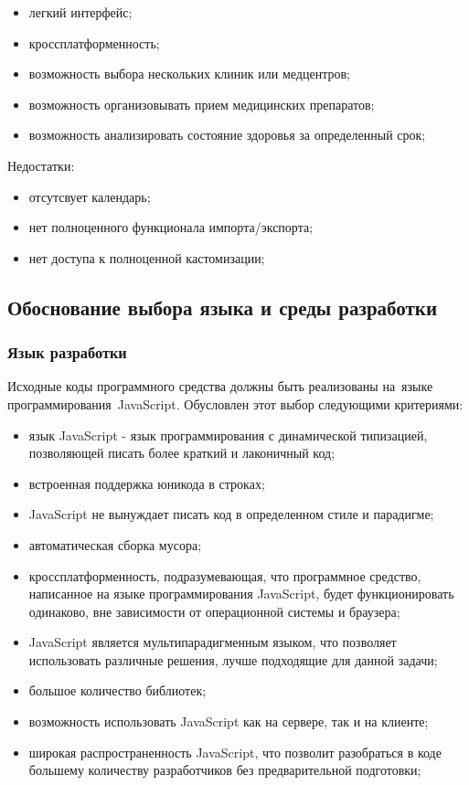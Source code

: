 \begin{itemize}
  \item легкий интерфейс;
  \item кроссплатформенность;
  \item возможность выбора нескольких клиник или медцентров;
  \item возможность организовывать прием медицинских препаратов;
  \item возможность анализировать состояние здоровья за определенный срок;
\end{itemize}
Недостатки:
\begin{itemize}
  \item отсутсвует календарь;
  \item нет полноценного функционала импорта/экспорта;
  \item нет доступа к полноценной кастомизации;
\end{itemize}


\subsection{Обоснование выбора языка и среды разработки} %
\label{sub:domain:existing_language}
\subsubsection{Язык разработки }

Исходные коды программного средства должны быть реализованы на языке программирования JavaScript. Обусловлен этот выбор следующими критериями:

\begin{itemize}
  \item язык JavaScript - язык программирования с динамической типизацией, позволяющей писать более краткий и лаконичный код;
  \item встроенная поддержка юникода в строках;
  \item JavaScript не вынуждает писать код в определенном стиле и парадигме;

  \item автоматическая сборка мусора;
  \item кроссплатформенность, подразумевающая, что программное средство, написанное на языке программирования JavaScript, будет функционировать одинаково, вне зависимости от операционной системы и браузера;
  \item JavaScript является мультипарадигменным языком, что позволяет использовать различные решения, лучше подходящие для данной задачи;

  \item большое количество библиотек;
  \item возможность использовать JavaScript как на сервере, так и на клиенте;
  \item широкая распространенность JavaScript, что позволит разобраться в коде большему количеству разработчиков без предварительной подготовки;
\end{itemize}

